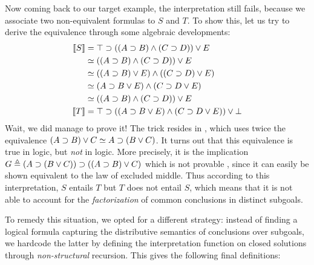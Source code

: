 Now coming back to our target example,
the interpretation still fails, because we associate two non-equivalent
formulas to $S$ and $T$. To show this, let us try to derive the equivalence
through some algebraic developments:
\begin{align}
  \sint{S} &= \top \limp ((A \limp B) \land (C \limp D)) \lor E \nonumber\\
              &\semequiv ((A \limp B) \land (C \limp D)) \lor E \nonumber\\
              &\semequiv ((A \limp B) \lor E) \land ((C \limp D) \lor E) \nonumber\\
              &\semequiv (A \limp B \lor E) \land (C \limp D \lor E) \labeq{grishin}\\
              &\semequiv ((A \limp B) \land (C \limp D)) \lor E \nonumber\\
  \sint{T} &= \top \limp ((A \limp B \lor E) \land (C \limp D \lor E)) \lor \bot \nonumber
\end{align}
Wait, we did manage to prove it! The trick resides in , which
uses twice the equivalence $(A \supset B) \lor C \simeq A \supset (B \lor C)$. It
turns out that this equivalence is true in  logic, but \emph{not} in
 logic. More precisely, it is the implication $G \triangleq (A \supset
(B \lor C)) \supset ((A \supset B) \lor C)$ which is not provable
, since it can easily be shown equivalent to the law of
excluded middle. Thus according to this interpretation, $S$
entails $T$ but $T$ does not entail $S$, which means that it is not able to
account for the \emph{factorization} of common conclusions in distinct subgoals.

To remedy this situation, we opted for a different strategy: instead of finding
a logical formula capturing the distributive semantics of conclusions over
subgoals, we hardcode the latter by defining the interpretation function on
closed solutions through \emph{non-structural} recursion. This gives the
following final definitions:

